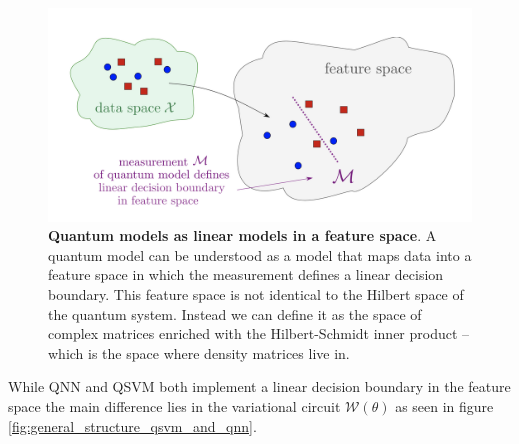 \begin{figure}[!h]
    \centering
    \includegraphics[width=0.7\linewidth]{thesis/Figures/qnn/2101.11020_Maria_Schuld_Fig.3.png} 
    \caption{\textbf{Quantum models as linear models in a feature space}. A quantum model can be understood as a model that maps data into a feature space in which the measurement defines a linear decision boundary. This feature space is not identical to the Hilbert space of the quantum system. Instead we can define it as the space of complex matrices enriched with the Hilbert-Schmidt inner product – which is the space where density matrices live in.\cite{schuld_SQMLmodelsAreKernelMethods}}
    \label{figure:2101.11020_Maria_Schuld_Fig.3}
\end{figure}

While QNN and QSVM both implement a linear decision boundary in the feature space the main difference lies in the variational circuit $\mathcal{W}(\theta)$ as seen in figure \ref{fig:general_structure_qsvm_and_qnn}.

